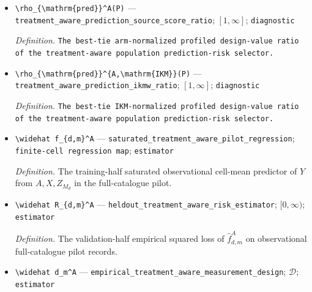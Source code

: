 \documentclass{article}
\begin{document}
\begin{itemize}
  \par\smallskip\noindent\emph{Definition.} The tie-preserving minimizer set of \(R_d^A(P)\) over the admissible family.
  \item \texttt{\textbackslash{}\allowbreak{}rho\_\allowbreak{}\{\textbackslash{}\allowbreak{}mathrm\{pred\}\allowbreak{}\}\allowbreak{}\textasciicircum{}A(P)} --- \texttt{treatment\_\allowbreak{}aware\_\allowbreak{}prediction\_\allowbreak{}source\_\allowbreak{}score\_\allowbreak{}ratio}; \([1,\infty]\); \texttt{diagnostic}
  \par\smallskip\noindent\emph{Definition.} \texttt{The best-\allowbreak{}tie arm-\allowbreak{}normalized profiled design-\allowbreak{}value ratio of the treatment-\allowbreak{}aware population prediction-\allowbreak{}risk selector.}
  \item \texttt{\textbackslash{}\allowbreak{}rho\_\allowbreak{}\{\textbackslash{}\allowbreak{}mathrm\{pred\}\allowbreak{}\}\allowbreak{}\textasciicircum{}\{A,\allowbreak{}\textbackslash{}\allowbreak{}mathrm\{IKM\}\allowbreak{}\}\allowbreak{}(P)} --- \texttt{treatment\_\allowbreak{}aware\_\allowbreak{}prediction\_\allowbreak{}ikmw\_\allowbreak{}ratio}; \([1,\infty]\); \texttt{diagnostic}
  \par\smallskip\noindent\emph{Definition.} \texttt{The best-\allowbreak{}tie IKM-\allowbreak{}normalized profiled design-\allowbreak{}value ratio of the treatment-\allowbreak{}aware population prediction-\allowbreak{}risk selector.}
  \item \texttt{\textbackslash{}\allowbreak{}widehat f\_\allowbreak{}\{d,\allowbreak{}m\}\allowbreak{}\textasciicircum{}A} --- \texttt{saturated\_\allowbreak{}treatment\_\allowbreak{}aware\_\allowbreak{}pilot\_\allowbreak{}regression}; \texttt{finite-\allowbreak{}cell regression map}; \texttt{estimator}
  \par\smallskip\noindent\emph{Definition.} The training-half saturated observational cell-mean predictor of \(Y\) from \(A,X,Z_{M_d}\) in the full-catalogue pilot.
  \item \texttt{\textbackslash{}\allowbreak{}widehat R\_\allowbreak{}\{d,\allowbreak{}m\}\allowbreak{}\textasciicircum{}A} --- \texttt{heldout\_\allowbreak{}treatment\_\allowbreak{}aware\_\allowbreak{}risk\_\allowbreak{}estimator}; \([0,\infty)\); \texttt{estimator}
  \par\smallskip\noindent\emph{Definition.} The validation-half empirical squared loss of \(\widehat f_{d,m}^A\) on observational full-catalogue pilot records.
  \item \texttt{\textbackslash{}\allowbreak{}widehat d\_\allowbreak{}m\textasciicircum{}A} --- \texttt{empirical\_\allowbreak{}treatment\_\allowbreak{}aware\_\allowbreak{}measurement\_\allowbreak{}design}; \(\mathcal D\); \texttt{estimator}

\end{itemize}
\end{document}
